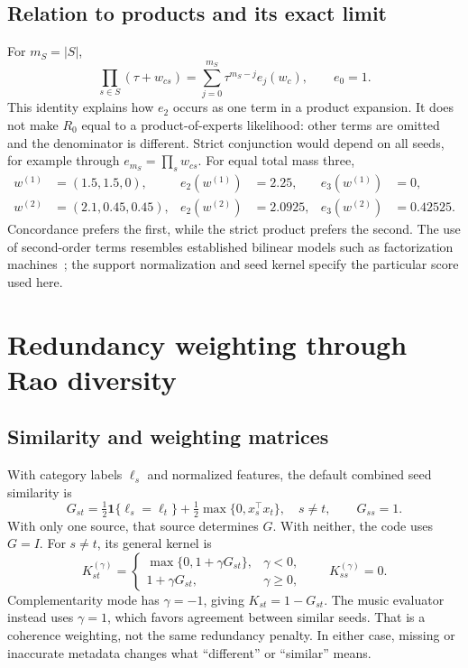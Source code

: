 \documentclass[11pt,a4paper]{article}
\theoremstyle{remark}
\newcommand{\ind}{\mathbf{1}}
\begin{document}
\subsection{Relation to products and its exact limit}
For $m_S=|S|$,
\begin{equation}
 \prod_{s\in S}(\tau+w_{cs})
 =\sum_{j=0}^{m_S}\tau^{m_S-j}e_j(w_c),\qquad e_0=1.
 \label{eq:product}
\end{equation}
This identity explains how $e_2$ occurs as one term in a product expansion.
It does not make $R_0$ equal to a product-of-experts likelihood: other
terms are omitted and the denominator is different. Strict conjunction
would depend on all seeds, for example through $e_{m_S}=\prod_s w_{cs}$.
For equal total mass three,
\begin{align*}
 w^{(1)}&=(1.5,1.5,0),& e_2(w^{(1)})&=2.25,&e_3(w^{(1)})&=0,\\
 w^{(2)}&=(2.1,0.45,0.45),& e_2(w^{(2)})&=2.0925,&e_3(w^{(2)})&=0.42525.
\end{align*}
Concordance prefers the first, while the strict product prefers the second.
The use of second-order terms resembles established bilinear models such
as factorization machines~\cite{rendle2010}; the support normalization
and seed kernel specify the particular score used here.

\section{Redundancy weighting through Rao diversity}
\subsection{Similarity and weighting matrices}
With category labels $\ell_s$ and normalized features, the default combined
seed similarity is
\begin{equation}
 G_{st}=\tfrac12\ind\{\ell_s=\ell_t\}
          +\tfrac12\max\{0,x_s^\top x_t\},\quad s\neq t,
 \qquad G_{ss}=1.
 \label{eq:similarity}
\end{equation}
With only one source, that source determines $G$. With neither, the code
uses $G=I$. For $s\neq t$, its general kernel is
\begin{equation}
 K^{(\gamma)}_{st}=\begin{cases}
   \max\{0,1+\gamma G_{st}\},&\gamma<0,\\
   1+\gamma G_{st},&\gamma\geq0,
 \end{cases}
 \qquad K^{(\gamma)}_{ss}=0.
 \label{eq:kernel}
\end{equation}
Complementarity mode has $\gamma=-1$, giving $K_{st}=1-G_{st}$.
The music evaluator instead uses $\gamma=1$, which favors agreement
between similar seeds. That is a coherence weighting, not the same
redundancy penalty. In either case, missing or inaccurate metadata changes
what ``different'' or ``similar'' means.
\end{document}
